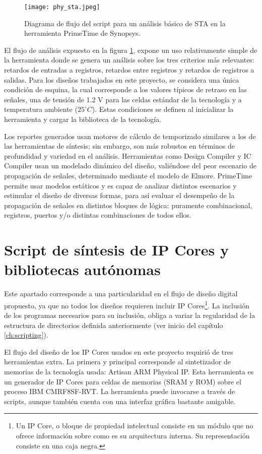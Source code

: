 \begin{figure}[ht]
\texttt{[image: phy\_sta.jpeg]}
\centering
\caption{Diagrama de flujo del script para un análisis básico de STA en la herramienta PrimeTime de Synopsys.}
\label{fig:stascript}
\end{figure}

El flujo de análisis expuesto en la figura \ref{fig:stascript}, expone un uso relativamente simple de la herramienta donde se genera un análisis sobre los tres criterios más relevantes: retardos de entradas a registros, retardos entre registros y retardos de registros a salidas. Para los diseños trabajados en este proyecto, se considera una única condición de esquina, la cual corresponde a los valores típicos de retraso en las señales, una de tensión de 1.2 V para las celdas estándar de la tecnología y a temperatura ambiente ($25^{\circ}C$). Estas condiciones se definen al inicializar la herramienta y cargar la biblioteca de la tecnología.

Los reportes generados usan motores de cálculo de temporizado similares a los de las herramientas de síntesis; sin embargo, son más robustos en términos de profundidad y variedad en el análisis. Herramientas como Design Compiler y IC Compiler usan un modelado dinámico del diseño, valiéndose del peor escenario de propagación de señales, determinado mediante el modelo de Elmore. PrimeTime permite usar modelos estáticos y es capaz de analizar distintos escenarios y estimular el diseño de diversas formas, para así evaluar el desempeño de la propagación de señales en distintos bloques de lógica: puramente combinacional, registros, puertos y/o distintas combinaciones de todos ellos.

\section{Script de síntesis de IP Cores y bibliotecas autónomas}
\label{sec:ip_syn}
Este apartado corresponde a una particularidad en el flujo de diseño digital propuesto, ya que no todos los diseños requieren incluir IP Cores\footnote{Un IP Core, o bloque de propiedad intelectual consiste en un módulo que no ofrece información sobre como es su arquitectura interna. Su representación consiste en una caja negra.}. La inclusión de los programas necesarios para su inclusión, obliga a variar la regularidad de la estructura de directorios definida anteriormente (ver inicio del capítulo \ref{ch:scripting}).

El flujo del diseño de los IP Cores usados en este proyecto requirió de tres herramientas extra. La primera y principal corresponde al sintetizador de memorias de la tecnología usada: Artisan ARM Physical IP. Esta herramienta es un generador de IP Cores para celdas de memorias (SRAM y ROM) sobre el proceso IBM CMRF8SF-RVT. La herramienta puede invocarse a través de scripts, aunque también cuenta con una interfaz gráfica bastante amigable.

